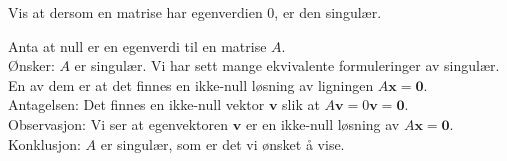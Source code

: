 \begin{oppgave}
Vis at dersom en matrise har egenverdien 0, er den singulær.
\end{oppgave}

\begin{losning} Anta at null er en egenverdi til en matrise $A$.	
\\
\noindent
Ønsker: $A$ er singulær. Vi har sett mange ekvivalente formuleringer av singulær. En av dem er at det finnes en ikke-null løsning av ligningen $A\mathbf{x}=\mathbf{0}$.
\\
\noindent
Antagelsen: Det finnes en ikke-null vektor $\mathbf{v}$ slik at $A\mathbf{v}=0 \mathbf{v}=\mathbf{0}$. 
\\
\noindent
Observasjon: Vi ser at egenvektoren $\mathbf{v}$ er en ikke-null løsning av $A\mathbf{x}=\mathbf{0}$.
\\
\noindent
Konklusjon: $A$ er singulær, som er det vi ønsket å vise.

\end{losning}


